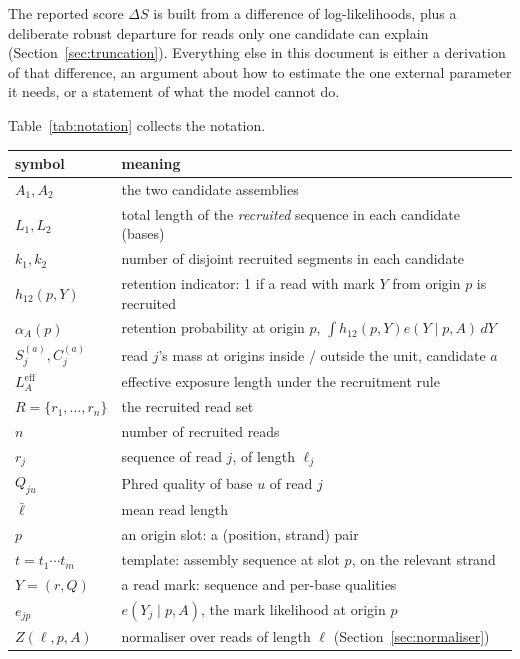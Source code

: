 \documentclass[11pt]{article}
\begin{document}
The reported score $\Delta S$ is built from a difference of log-likelihoods,
plus a deliberate robust departure for reads only one candidate can explain
(Section~\ref{sec:truncation}).  Everything else in this document is either a
derivation of that difference, an argument about how to estimate the one
external parameter it needs, or a statement of what the model cannot do.

Table~\ref{tab:notation} collects the notation.

\begin{table}[t]
\centering
\small
\begin{tabular}{ll}
\toprule
symbol & meaning \\
\midrule
$A_1, A_2$      & the two candidate assemblies \\
$L_1, L_2$      & total length of the \emph{recruited} sequence in each candidate (bases) \\
$k_1, k_2$      & number of disjoint recruited segments in each candidate \\
$h_{12}(p,Y)$   & retention indicator: 1 if a read with mark $Y$ from origin $p$ is recruited \\
$\alpha_A(p)$   & retention probability at origin $p$, $\int h_{12}(p,Y)e(Y\mid p,A)\,dY$ \\
$S^{(a)}_j, C^{(a)}_j$ & read $j$'s mass at origins inside / outside the unit, candidate $a$ \\
$L_A^{\mathrm{eff}}$ & effective exposure length under the recruitment rule \\
$R=\{r_1,\dots,r_n\}$ & the recruited read set \\
$n$             & number of recruited reads \\
$r_j$           & sequence of read $j$, of length $\ell_j$ \\
$Q_{ju}$        & Phred quality of base $u$ of read $j$ \\
$\bar\ell$      & mean read length \\
$p$             & an origin slot: a (position, strand) pair \\
$t = t_1\cdots t_m$ & template: assembly sequence at slot $p$, on the relevant strand \\
$Y=(r,Q)$       & a read mark: sequence and per-base qualities \\
$e_{jp}$        & $e(Y_j\mid p,A)$, the mark likelihood at origin $p$ \\
$Z(\ell,p,A)$   & normaliser over reads of length $\ell$ (Section~\ref{sec:normaliser}) \\

\end{tabular}
\end{table}
\end{document}
